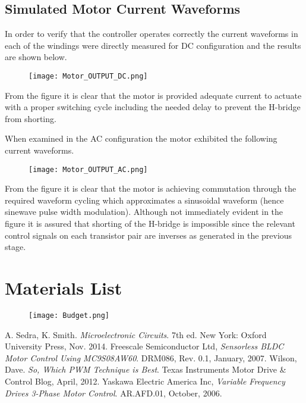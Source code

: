 \documentclass[12pt]{article}
\begin{document}
\begin{appendices}
\subsection{Simulated Motor Current Waveforms}

In order to verify that the controller operates correctly the current waveforms in each of the windings were directly measured for DC configuration and the results are shown below.

\begin{figure}[H]
\centering
\texttt{[image: Motor\_OUTPUT\_DC.png]}
\label{Triangle_Gen_Output}
\end{figure}

From the figure it is clear that the motor is provided adequate current to actuate with a proper switching cycle including the needed delay to prevent the H-bridge from shorting.  

When examined in the AC configuration the motor exhibited the following current waveforms.

\begin{figure}[H]
\centering
\texttt{[image: Motor\_OUTPUT\_AC.png]}
\label{Triangle_Gen_Output}
\end{figure}

From the figure it is clear that the motor is achieving commutation through the required waveform cycling which approximates a sinusoidal waveform (hence sinewave pulse width modulation). Although not immediately evident in the figure it is assured that shorting of the H-bridge is impossible since the relevant control signals on each transistor pair are inverses as generated in the previous stage.

\section{Materials List}

\begin{figure}[H]
\centering
\texttt{[image: Budget.png]}
\label{Triangle_Gen_Output}
\end{figure}
\end{appendices}

\begin{thebibliography}{99}
	    A. Sedra, K. Smith. \emph{Microelectronic Circuits}. 7th ed.
	    New York: Oxford University Press, Nov. 2014.
		Freescale Semiconductor Ltd, \emph{Sensorless BLDC Motor Control Using MC9S08AW60}.
		DRM086,
		Rev. 0.1,
		January, 2007.
		Wilson, Dave. \emph{So, Which PWM Technique is Best}.
		Texas Instruments Motor Drive \& Control Blog,
		April, 2012.
		Yaskawa Electric America Inc, \emph{Variable Frequency Drives 3-Phase Motor Control}.
		AR.AFD.01,
		October, 2006.
	    
	    
\end{thebibliography}
\end{document}
